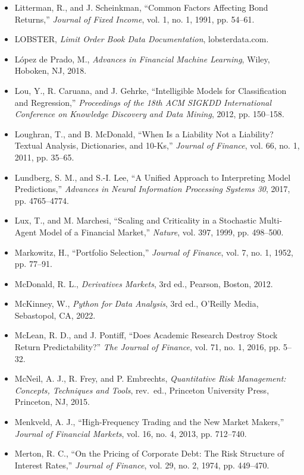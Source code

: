 \documentclass{book}
\begin{document}
\begin{itemize}
    \item Litterman, R., and J. Scheinkman, ``Common Factors Affecting Bond Returns,'' \emph{Journal of Fixed Income}, vol. 1, no. 1, 1991, pp. 54--61.
    \item LOBSTER, \emph{Limit Order Book Data Documentation}, lobsterdata.com.
    \item L\'opez de Prado, M., \emph{Advances in Financial Machine Learning}, Wiley, Hoboken, NJ, 2018.
    \item Lou, Y., R. Caruana, and J. Gehrke, ``Intelligible Models for Classification and Regression,'' \emph{Proceedings of the 18th ACM SIGKDD International Conference on Knowledge Discovery and Data Mining}, 2012, pp. 150--158.
    \item Loughran, T., and B. McDonald, ``When Is a Liability Not a Liability? Textual Analysis, Dictionaries, and 10-Ks,'' \emph{Journal of Finance}, vol. 66, no. 1, 2011, pp. 35--65.
    \item Lundberg, S. M., and S.-I. Lee, ``A Unified Approach to Interpreting Model Predictions,'' \emph{Advances in Neural Information Processing Systems 30}, 2017, pp. 4765--4774.
    \item Lux, T., and M. Marchesi, ``Scaling and Criticality in a Stochastic Multi-Agent Model of a Financial Market,'' \emph{Nature}, vol. 397, 1999, pp. 498--500.
    \item Markowitz, H., ``Portfolio Selection,'' \emph{Journal of Finance}, vol. 7, no. 1, 1952, pp. 77--91.
    \item McDonald, R. L., \emph{Derivatives Markets}, 3rd ed., Pearson, Boston, 2012.
    \item McKinney, W., \emph{Python for Data Analysis}, 3rd ed., O'Reilly Media, Sebastopol, CA, 2022.
    \item McLean, R. D., and J. Pontiff, ``Does Academic Research Destroy Stock Return Predictability?'' \emph{The Journal of Finance}, vol. 71, no. 1, 2016, pp. 5--32.
    \item McNeil, A. J., R. Frey, and P. Embrechts, \emph{Quantitative Risk Management: Concepts, Techniques and Tools}, rev.\ ed., Princeton University Press, Princeton, NJ, 2015.
    \item Menkveld, A. J., ``High-Frequency Trading and the New Market Makers,'' \emph{Journal of Financial Markets}, vol. 16, no. 4, 2013, pp. 712--740.
    \item Merton, R. C., ``On the Pricing of Corporate Debt: The Risk Structure of Interest Rates,'' \emph{Journal of Finance}, vol. 29, no. 2, 1974, pp. 449--470.

\end{itemize}
\end{document}
